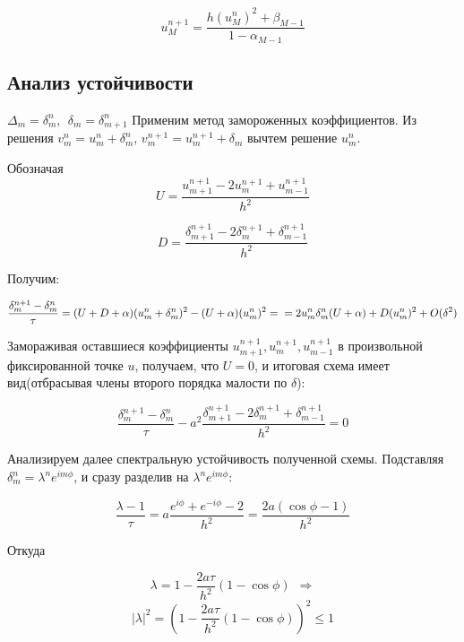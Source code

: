 \documentclass[11pt]{article}
\begin{document}
\[ u_M^{n+1} = \frac{h (u_M^n)^2 + \beta_{M-1}}{1-\alpha_{M-1}}\]

    \hypertarget{ux430ux43dux430ux43bux438ux437-ux443ux441ux442ux43eux439ux447ux438ux432ux43eux441ux442ux438}{%
\subsection{Анализ
устойчивости}\label{ux430ux43dux430ux43bux438ux437-ux443ux441ux442ux43eux439ux447ux438ux432ux43eux441ux442ux438}}

    \(\Delta_m = \delta_m^n, \ \ \delta_m = \delta_{m+1}^n\) Применим метод
замороженных коэффициентов. Из решения \(v_m^n = u_m^n + \delta_m^n\),
\(v_m^{n+1} = u_m^{n+1} + \delta_m\) вычтем решение \(u_m^n\).

Обозначая
\[U = \frac{u^{n+1}_{m+1} - 2u^{n+1}_{m} + u^{n+1}_{m-1}}{h^2}\]

\[D = \frac{\delta^{n+1}_{m+1} - 2\delta^{n+1}_{m} + \delta^{n+1}_{m-1}}{h^2}\]

Получим:

\begin{equation}
    \frac{\delta^{n+1}_{m} - \delta^{n}_{m}}{\tau} = (U+D+\alpha)(u_m^n + \delta_m^n)^2 -
    (U + \alpha)(u_m^n)^2 = \\
    = 2u_m^n \delta_m^n (U+\alpha) + D (u_m^n)^2 + O(\delta^2) 
\end{equation}

Замораживая оставшиеся коэффициенты
\(u^{n+1}_{m+1}, u^{n+1}_{m}, u^{n+1}_{m-1}\) в произвольной
фиксированной точке \(u\), получаем, что \(U = 0\), и итоговая схема
имеет вид(отбрасывая члены второго порядка малости по \(\delta\)):

\begin{equation}
    \frac{\delta^{n+1}_{m} - \delta^{n}_{m}}{\tau} - a^2 \frac{\delta^{n+1}_{m+1} - 2\delta^{n+1}_{m} + \delta^{n+1}_{m-1}}{h^2} = 0
\end{equation}

Анализируем далее спектральную устойчивость полученной схемы. Подставляя
\(\delta_{m}^n = \lambda^n e^{i m \phi}\), и сразу разделив на
\(\lambda^n e^{i m \phi}\):

\begin{equation}
\frac{\lambda - 1}{\tau} = a \frac{e^{i \phi} + e^{-i \phi} - 2}{h^2} = \frac{2a (\cos {\phi} - 1) }{h^2}
\end{equation}

Откуда

\[\lambda = 1 - \frac{2a \tau}{h^2}(1- \cos{\phi}) \ \ \Rightarrow\]
\[| \lambda |^2 = \left( 1 - \frac{2a \tau}{h^2}(1- \cos{\phi}) \right)^2  \le 1\]
\end{document}

